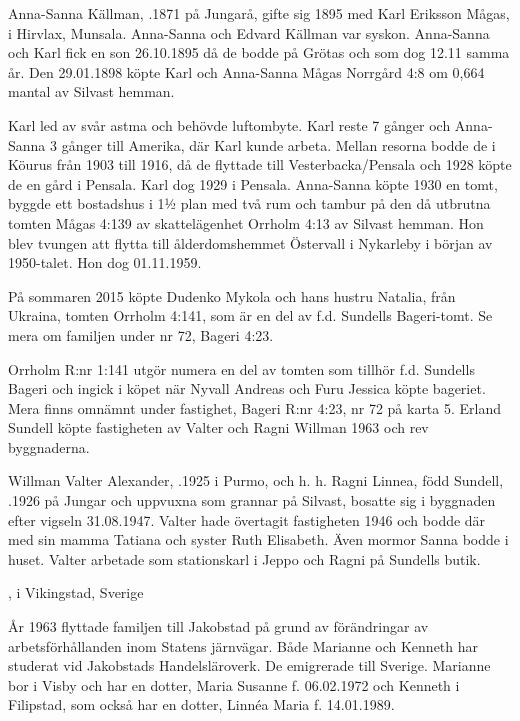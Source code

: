 Anna-Sanna Källman, .1871 på Jungarå, gifte sig 1895 med Karl Eriksson Mågas,  i Hirvlax, Munsala. Anna-Sanna och Edvard Källman var syskon. Anna-Sanna och Karl fick en son 26.10.1895 då de bodde på Grötas och som dog 12.11 samma år. Den 29.01.1898 köpte Karl och Anna-Sanna Mågas Norrgård 4:8 om 0,664 mantal av Silvast hemman.

Karl led av svår astma och behövde luftombyte. Karl reste 7 gånger och Anna-Sanna 3 gånger till Amerika, där Karl kunde arbeta. Mellan resorna bodde de i Köurus från 1903 till 1916, då de flyttade till Vesterbacka/Pensala och 1928 köpte de en gård i Pensala. Karl dog 1929 i Pensala. Anna-Sanna köpte 1930 en tomt, byggde ett bostadshus i 1½ plan med två rum och tambur på den då utbrutna	tomten Mågas 4:139 av skattelägenhet Orrholm 4:13 av Silvast hemman. Hon blev tvungen att flytta till ålderdomshemmet Östervall i Nykarleby i början av 1950-talet. Hon dog 01.11.1959.





På sommaren 2015 köpte Dudenko Mykola och hans hustru Natalia, från Ukraina, tomten Orrholm 4:141, som är en del av f.d. Sundells Bageri-tomt. Se mera om familjen under nr 72, Bageri 4:23.


Orrholm R:nr 1:141 utgör numera en del av tomten som tillhör  f.d. Sundells Bageri och ingick i köpet när  Nyvall Andreas och Furu Jessica köpte bageriet. Mera finns omnämnt under fastighet, Bageri R:nr 4:23, nr 72 på karta 5. Erland Sundell köpte fastigheten av Valter och Ragni Willman 1963 och rev byggnaderna.


Willman Valter Alexander, .1925  i Purmo, och h. h. Ragni Linnea, född Sundell, .1926 på Jungar och uppvuxna som grannar på Silvast, bosatte sig i byggnaden efter vigseln 31.08.1947. Valter hade övertagit fastigheten 1946 och bodde där med sin mamma Tatiana och syster Ruth Elisabeth. Även mormor Sanna bodde i huset. Valter arbetade som stationskarl i Jeppo och Ragni på Sundells butik.
\begin{jhchildren}
  \item {}, i Vikingstad, Sverige
  \item {}
\end{jhchildren}
År 1963 flyttade familjen till Jakobstad på grund av förändringar av arbetsförhållanden inom Statens järnvägar. Både Marianne och Kenneth har studerat vid Jakobstads Handelsläroverk. De emigrerade till Sverige. Marianne bor i Visby och har en dotter, Maria Susanne f. 06.02.1972 och Kenneth i Filipstad, som också har en dotter, Linnéa Maria f. 14.01.1989.

